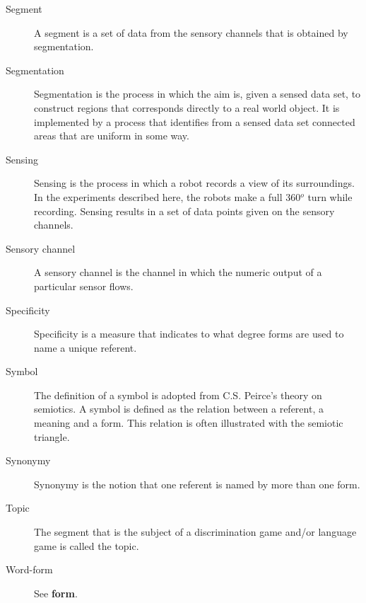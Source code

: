 \begin{description}
\item[Segment] A segment is a set of data from the sensory channels that is obtained by segmentation.

\item[Segmentation] Segmentation is the process in which the aim is, given a sensed data set, to construct regions that corresponds directly to a real world object. It is implemented by a process that identifies from a sensed data set connected areas that are uniform in some way.

\item[Sensing] Sensing is the process in which a robot records a  view of its surroundings. In the experiments described here, the robots make a full 360$^o$ turn while recording. Sensing results in a set of data points given on the sensory channels.

\item[Sensory channel] A sensory channel is the channel in which the numeric output of a particular sensor flows.

\item[Specificity] Specificity is a measure that indicates to what degree forms are used to name a unique referent.

\item[Symbol] The definition of a symbol is adopted from C.S. Peirce's theory on semiotics. A symbol is defined as the relation between a referent, a meaning and a form. This relation is often illustrated with the semiotic triangle. 

\item[Synonymy] Synonymy is the notion that one referent is named by more than one form.

\item[Topic] The segment that is the subject of a discrimination game and/or language game is called the topic.

\item[Word-form] See {\bf form}.

\end{description}








